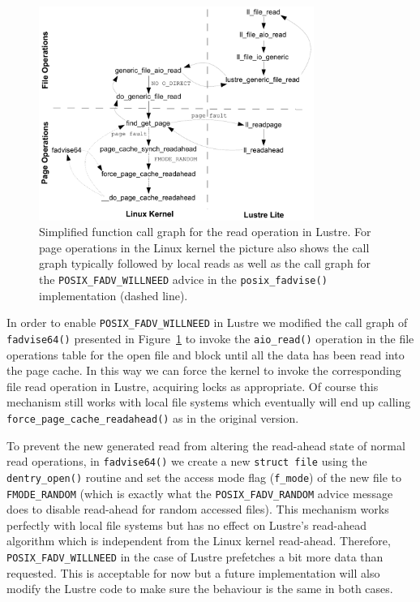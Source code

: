 \begin{figure}[!htb]
  \centering
  \includegraphics[width=0.8\textwidth]{chapters/chapter2/figures/kernel}
  \caption{Simplified function call graph for the read operation in Lustre. For page operations in the Linux kernel the picture also shows the call graph typically followed by local reads as well as the call graph for the \texttt{POSIX\_FADV\_WILLNEED} advice in the \texttt{posix\_fadvise()} implementation (dashed line).}
  \label{figure: kernel}
\end{figure}

In order to enable \texttt{POSIX\_FADV\_WILLNEED} in Lustre we modified the call graph of \texttt{fadvise64()} presented in Figure~\ref{figure: kernel} to invoke the \texttt{aio\_read()} operation in the file operations table for the open file and block until all the data has been read into the page cache. In this way we can force the kernel to invoke the corresponding file read operation in Lustre, acquiring locks as appropriate. Of course this mechanism still works with local file systems which eventually will end up calling \texttt{force\_page\_cache\_readahead()} as in the original version.

To prevent the new generated read from altering the read-ahead state of normal read operations, in \texttt{fadvise64()} we create a new \texttt{struct file} using the \texttt{dentry\_open()} routine and set the access mode flag (\texttt{f\_mode}) of the new file to \texttt{FMODE\_RANDOM} (which is exactly what the \texttt{POSIX\_FADV\_RANDOM} advice message does to disable read-ahead for random accessed files). This mechanism works perfectly with local file systems but has no effect on Lustre's read-ahead algorithm which is independent from the Linux kernel read-ahead. Therefore, \texttt{POSIX\_FADV\_WILLNEED} in the case of Lustre prefetches a bit more data than requested. This is acceptable for now but a future implementation will also modify the Lustre code to make sure the behaviour is the same in both cases.

